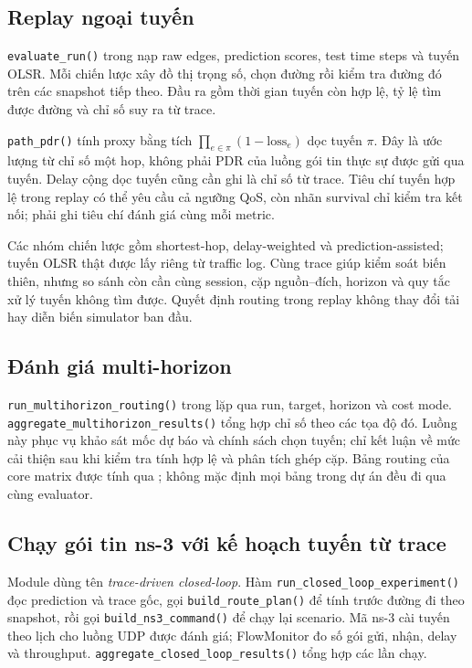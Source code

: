 \documentclass[12pt,a4paper]{article}
\newcommand{\code}[1]{{\small\texttt{#1}}}
\begin{document}
\subsection{Replay ngoại tuyến}

\code{evaluate\_run()} trong  nạp raw edges, prediction scores, test time steps và tuyến OLSR. Mỗi chiến lược xây đồ thị trọng số, chọn đường rồi kiểm tra đường đó trên các snapshot tiếp theo. Đầu ra gồm thời gian tuyến còn hợp lệ, tỷ lệ tìm được đường và chỉ số suy ra từ trace.

\code{path\_pdr()} tính proxy bằng tích \(\prod_{e\in\pi}(1-\mathrm{loss}_e)\) dọc tuyến \(\pi\). Đây là ước lượng từ chỉ số một hop, không phải PDR của luồng gói tin thực sự được gửi qua tuyến. Delay cộng dọc tuyến cũng cần ghi là chỉ số từ trace. Tiêu chí tuyến hợp lệ trong replay có thể yêu cầu cả ngưỡng QoS, còn nhãn survival chỉ kiểm tra kết nối; phải ghi tiêu chí đánh giá cùng mỗi metric.

Các nhóm chiến lược gồm shortest-hop, delay-weighted và prediction-assisted; tuyến OLSR thật được lấy riêng từ traffic log. Cùng trace giúp kiểm soát biến thiên, nhưng so sánh còn cần cùng session, cặp nguồn--đích, horizon và quy tắc xử lý tuyến không tìm được. Quyết định routing trong replay không thay đổi tải hay diễn biến simulator ban đầu.

\subsection{Đánh giá multi-horizon}

\code{run\_multihorizon\_routing()} trong  lặp qua run, target, horizon và cost mode. \code{aggregate\_multihorizon\_results()} tổng hợp chỉ số theo các tọa độ đó. Luồng này phục vụ khảo sát mốc dự báo và chính sách chọn tuyến; chỉ kết luận về mức cải thiện sau khi kiểm tra tính hợp lệ và phân tích ghép cặp. Bảng routing của core matrix được tính qua ; không mặc định mọi bảng trong dự án đều đi qua cùng evaluator.

\subsection{Chạy gói tin ns-3 với kế hoạch tuyến từ trace}

Module  dùng tên \emph{trace-driven closed-loop}. Hàm \code{run\_closed\_loop\_experiment()} đọc prediction và trace gốc, gọi \code{build\_route\_plan()} để tính trước đường đi theo snapshot, rồi gọi \code{build\_ns3\_command()} để chạy lại scenario. Mã ns-3 cài tuyến theo lịch cho luồng UDP được đánh giá; FlowMonitor đo số gói gửi, nhận, delay và throughput. \code{aggregate\_closed\_loop\_results()} tổng hợp các lần chạy.
\end{document}
